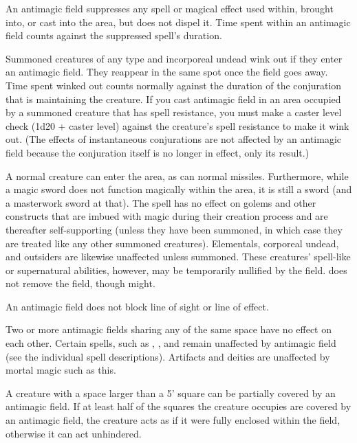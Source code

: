 An antimagic field suppresses any spell or magical effect used within, brought into, or cast into the area, but does not dispel it. 
Time spent within an antimagic field counts against the suppressed spell's duration.

Summoned creatures of any type and incorporeal undead wink out if they enter an antimagic field. 
They reappear in the same spot once the field goes away. 
Time spent winked out counts normally against the duration of the conjuration that is maintaining the creature. 
If you cast antimagic field in an area occupied by a summoned creature that has spell resistance, you must make a caster level check (1d20 + caster level) 
against the creature's spell resistance to make it wink out. 
(The effects of instantaneous conjurations are not affected by an antimagic field because the conjuration itself is no longer in effect, only its result.)

A normal creature can enter the area, as can normal missiles. Furthermore, while a magic sword does not function magically within the area, 
it is still a sword (and a masterwork sword at that). 
The spell has no effect on golems and other constructs that are imbued with magic during their creation process and are thereafter self-supporting 
(unless they have been summoned, in which case they are treated like any other summoned creatures). 
Elementals, corporeal undead, and outsiders are likewise unaffected unless summoned. 
These creatures' spell-like or supernatural abilities, however, may be temporarily nullified by the field. 
 does not remove the field, though  might.

An antimagic field does not block line of sight or line of effect.

Two or more antimagic fields sharing any of the same space have no effect on each other. 
Certain spells, such as , , and  
remain unaffected by antimagic field (see the individual spell descriptions). 
Artifacts and deities are unaffected by mortal magic such as this.

A creature with a space larger than a 5' square can be partially covered by an antimagic field.
If at least half of the squares the creature occupies are covered by an antimagic field, the creature acts as if it were fully enclosed within the field,
otherwise it can act unhindered.

